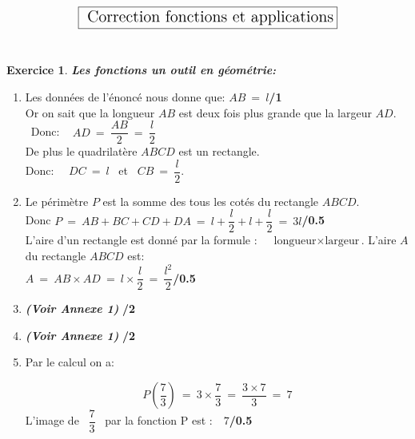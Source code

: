 \documentclass[a4paper,10pt]{article}
\theoremstyle{definition}
\theoremstyle{definition}
\newtheorem{exo}{Exercice}
\begin{document}
	
\lhead{}\chead{}\rhead{}\renewcommand{\headrulewidth}{0pt}\renewcommand{\footrulewidth}{0.4pt}

$$\fbox{\text{\Large{ Correction fonctions et applications}}}$$
\hfil\\



\begin{exo}\textit{\textbf{Les fonctions un outil en géométrie:}}\\

	\begin{enumerate}
		\item Les données de l'énoncé nous donne que:  $AB \ = \ l$\hfill\textbf{/1}\\
		Or on sait que la longueur $AB$ est deux fois plus grande que la largeur $AD$. ~Donc: ~ $AD \ = \ \dfrac{AB}{2}\ = \ \dfrac{l}{2}$\\
		De plus le quadrilatère $ABCD$ est un rectangle.\\ Donc:~~
		$DC \ = \ l$ ~et~ $CB \ = \ \dfrac{l}{2}$.\\
		
		\item Le périmètre $P$ est la somme des tous les cotés du rectangle $ABCD$.\\
		 Donc $P\ = \ AB + BC + CD + DA \ = \ l + \dfrac{l}{2} + l + \dfrac{l}{2} \ = \ 3l $\hfill\textbf{/0.5}\\
		 
		 L'aire d'un rectangle est donné par la formule :~~ $\text{longueur} \times \text{largeur}$.\quad
		 L'aire $A$ du rectangle $ABCD$ est:\\
		 $A \ = \ AB \times AD \ = \ l \times \dfrac{l}{2}  \ = \ \dfrac{l^2}{2}$\hfill\textbf{/0.5}

		\item \textbf{\textit{(Voir Annexe 1)}} \hfill\textbf{/2}
		\item \textit{ \textbf{(Voir Annexe 1)}} \hfill\textbf{/2} 
		\item Par le calcul on a:
		
		 $$ P\left(\dfrac{7}{3}\right) \ = \ 3\times \dfrac{7}{3} \ = \ \dfrac{3\times7}{3} \ = \ 7$$
		L'image de ~$\dfrac{7}{3}$~ par la fonction P est :~~$7$\hfill\textbf{/0.5}
		

\end{enumerate}
\end{exo}
\end{document}
